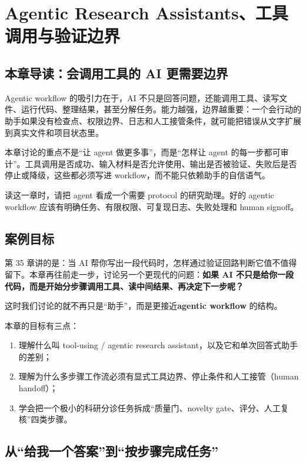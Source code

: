 \chapter{Agentic Research Assistants、工具调用与验证边界}

\section{本章导读：会调用工具的 AI 更需要边界}

Agentic workflow 的吸引力在于，AI 不只是回答问题，还能调用工具、读写文件、运行代码、整理结果，甚至分解任务。能力越强，边界越重要：一个会行动的助手如果没有检查点、权限边界、日志和人工接管条件，就可能把错误从文字扩展到真实文件和项目状态里。

本章讨论的重点不是“让 agent 做更多事”，而是“怎样让 agent 的每一步都可审计”。工具调用是否成功、输入材料是否允许使用、输出是否被验证、失败后是否停止或降级，这些都必须写进 workflow，而不能只依赖助手的自信语气。

读这一章时，请把 agent 看成一个需要 protocol 的研究助理。好的 agentic workflow 应该有明确任务、有限权限、可复现日志、失败处理和 human signoff。

\section{案例目标}

第 35 章讲的是：当 AI 帮你写出一段代码时，怎样通过验证回路判断它值不值得留下。本章再往前走一步，讨论另一个更现代的问题：\textbf{如果 AI 不只是给你一段代码，而是开始分步骤调用工具、读中间结果、再决定下一步呢？}

这时我们讨论的就不再只是“助手”，而是更接近\textbf{agentic workflow} 的结构。

本章的目标有三点：

\begin{enumerate}
    \item 理解什么叫 tool-using / agentic research assistant，以及它和单次回答式助手的差别；
    \item 理解为什么多步骤工作流必须有显式工具边界、停止条件和人工接管（human handoff）；
    \item 学会把一个极小的科研分诊任务拆成“质量门、novelty gate、评分、人工复核”四类步骤。
\end{enumerate}

\section{从“给我一个答案”到“按步骤完成任务”}

